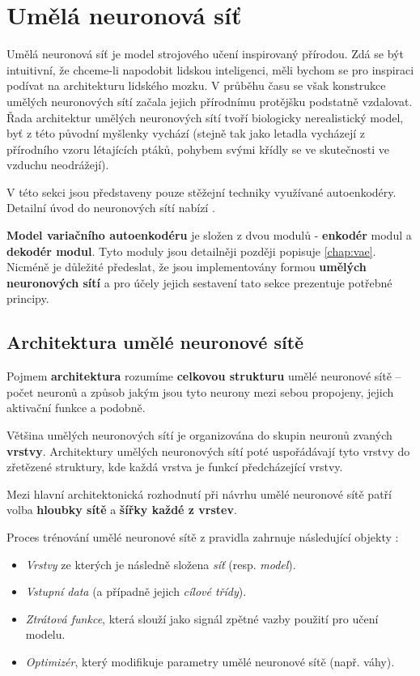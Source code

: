 \section{Umělá neuronová síť}
\label{sec:neural_network}
Umělá neuronová síť je model strojového učení inspirovaný přírodou.
Zdá se být intuitivní, že chceme-li napodobit lidskou inteligenci, měli bychom se pro inspiraci podívat na architekturu lidského mozku.
V průběhu času se však konstrukce umělých neuronových sítí začala jejich přírodnímu protějšku podstatně vzdalovat.
Řada architektur umělých neuronových sítí tvoří biologicky nerealistický model, byť z této původní myšlenky vychází (stejně tak jako letadla vycházejí z přírodního vzoru létajících ptáků, pohybem svými křídly se ve skutečnosti ve vzduchu neodrážejí). \cite{Geron2019}

V této sekci jsou představeny pouze stěžejní techniky využívané autoenkodéry. Detailní úvod do neuronových sítí nabízí \textcite{Chollet2017, Geron2019}.

\textbf{Model variačního autoenkodéru} je složen z dvou modulů - \textbf{enkodér} modul a \textbf{dekodér modul}.
Tyto moduly jsou detailněji později popisuje \autoref{chap:vae}.
Nicméně je důležité předeslat, že jsou implementovány formou \textbf{umělých neuronových sítí} a pro účely jejich sestavení tato sekce prezentuje potřebné principy.

\subsection{Architektura umělé neuronové sítě}
\label{sec:neural_network_architecture}
Pojmem \textbf{architektura} rozumíme \textbf{celkovou strukturu} umělé neuronové sítě – počet neuronů a způsob jakým jsou tyto neurony mezi sebou propojeny, jejich aktivační funkce a podobně.

Většina umělých neuronových sítí je organizována do skupin neuronů zvaných \textbf{vrstvy}.
Architektury umělých neuronových sítí poté uspořádávají tyto vrstvy do zřetězené struktury, kde každá vrstva je funkcí předcházející vrstvy. \cite{Goodfellow2016}

Mezi hlavní architektonická rozhodnutí při návrhu umělé neuronové sítě patří volba \textbf{hloubky sítě} a \textbf{šířky každé z vrstev}.

Proces trénování umělé neuronové sítě z pravidla zahrnuje následující objekty \cite{Chollet2017}:
\begin{itemize}
    \item \emph{Vrstvy} ze kterých je následně složena \emph{síť} (resp. \emph{model}).
    \item \emph{Vstupní data} (a případně jejich \emph{cílové třídy}).
    \item \emph{Ztrátová funkce}, která slouží jako signál zpětné vazby použití pro učení modelu.
    \item \emph{Optimizér}, který modifikuje parametry umělé neuronové sítě (např. váhy).
\end{itemize}

